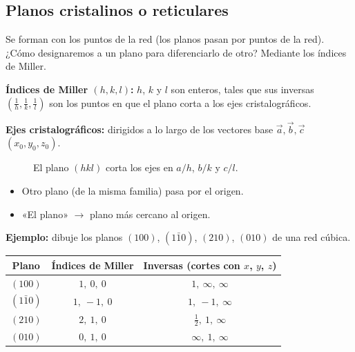 \documentclass[11pt,a4paper]{article}
\begin{document}
\subsection{Planos cristalinos o reticulares}
Se forman con los puntos de la red (los planos pasan por puntos de la red). ¿Cómo designaremos a un plano para
diferenciarlo de otro? Mediante los índices de Miller.

\textbf{Índices de Miller $(h,k,l)$:} $h$, $k$ y $l$ son enteros, tales que sus inversas $\left(\frac1h,\frac1k,\frac1l\right)$ son los
puntos en que el plano corta a los ejes cristalográficos.

\textbf{Ejes cristalográficos:} dirigidos a lo largo de los vectores base $\vec a,\vec b,\vec c$ $(x_0,y_0,z_0)$.

\begin{figure}[H]
\centering
{}
\caption{El plano $(hkl)$ corta los ejes en $a/h$, $b/k$ y $c/l$.}
\end{figure}

\begin{itemize}
  \item Otro plano (de la misma familia) pasa por el origen.
  \item «El plano» $\rightarrow$ plano más cercano al origen.
\end{itemize}

\textbf{Ejemplo:} dibuje los planos $(100)$, $(1\bar10)$, $(210)$, $(010)$ de una red cúbica.

\begin{center}
\begin{tabular}{ccc}
\toprule
Plano & Índices de Miller & Inversas (cortes con $x$, $y$, $z$)\\
\midrule
$(100)$ & $1,\ 0,\ 0$ & $1,\ \infty,\ \infty$\\
$(1\bar10)$ & $1,\ -1,\ 0$ & $1,\ -1,\ \infty$\\
$(210)$ & $2,\ 1,\ 0$ & $\tfrac12,\ 1,\ \infty$\\
$(010)$ & $0,\ 1,\ 0$ & $\infty,\ 1,\ \infty$\\
\bottomrule
\end{tabular}
\end{center}
\end{document}
